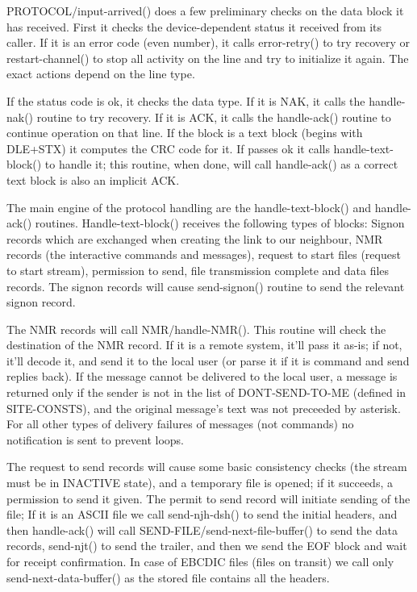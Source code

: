 PROTOCOL/input-arrived() does a few preliminary checks  on  the  data
block  it  has  received. First it checks the device-dependent status it
received from its caller. If it is an error code (even number), it calls
error-retry()  to try recovery or restart-channel() to stop all activity
on the line and try to initialize it again. The exact actions depend  on
the line type.

If  the  status code is ok, it checks the data type. If it is NAK, it
calls the handle-nak() routine to try recovery. If it is ACK,  it  calls
the  handle-ack()  routine  to  continue  operation on that line. If the
block is a text block (begins with DLE+STX) it computes the CRC code for
it.  If  passes  ok  it  calls  handle-text-block()  to  handle it; this
routine, when done, will call handle-ack() as a correct  text  block  is
also an implicit ACK.

The  main engine of the protocol handling are the handle-text-block()
and handle-ack() routines. Handle-text-block()  receives  the  following
types  of  blocks:  Signon records which are exchanged when creating the
link to  our  neighbour,  NMR  records  (the  interactive  commands  and
messages),  request to start files (request to start stream), permission
to send, file transmission complete and data files records.
The signon records will cause send-signon() routine to send the relevant
signon record.

The  NMR records will call NMR/handle-NMR(). This routine will check the
destination of the NMR record. If it is a remote system, it'll  pass  it
as-is;  if not, it'll decode it, and send it to the local user (or parse
it if it is command and send replies back). If  the  message  cannot  be
delivered to the local user, a message is returned only if the sender is
not in the list of DONT-SEND-TO-ME (defined  in  SITE-CONSTS),  and  the
original  message's  text  was  not preceeded by asterisk. For all other
types of delivery failures of messages (not commands) no notification is
sent to prevent loops.

The  request  to  send  records will cause some basic consistency checks
(the stream must be in INACTIVE state), and a temporary file is  opened;
if it succeeds, a permission to send it given.
The permit to send record will initiate sending of the file; If it is an
ASCII file we call send-njh-dsh() to send the initial headers, and  then
handle-ack()  will  call  SEND-FILE/send-next-file-buffer()  to send the
data records, send-njt() to send the trailer, and then we send  the  EOF
block  and wait for receipt confirmation. In case of EBCDIC files (files
on transit) we call only  send-next-data-buffer()  as  the  stored  file
contains all the headers.

